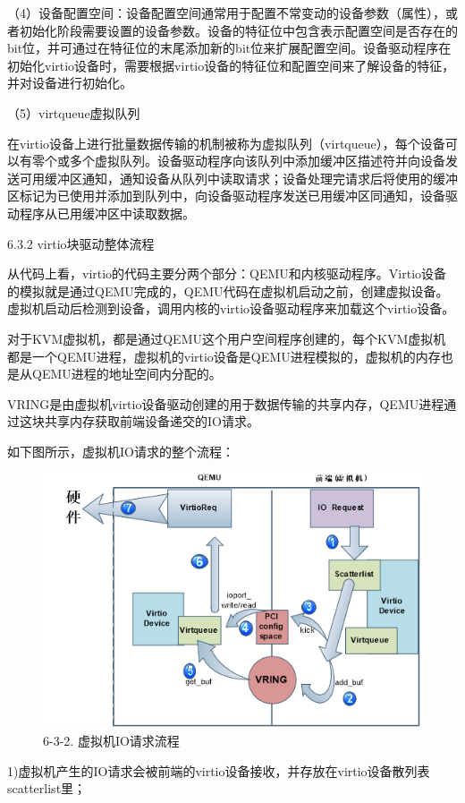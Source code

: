 （4）设备配置空间：设备配置空间通常用于配置不常变动的设备参数（属性），或者初始化阶段需要设置的设备参数。设备的特征位中包含表示配置空间是否存在的bit位，并可通过在特征位的末尾添加新的bit位来扩展配置空间。设备驱动程序在初始化virtio设备时，需要根据virtio设备的特征位和配置空间来了解设备的特征，并对设备进行初始化。

（5）virtqueue虚拟队列

在virtio设备上进行批量数据传输的机制被称为虚拟队列（virtqueue），每个设备可以有零个或多个虚拟队列。设备驱动程序向该队列中添加缓冲区描述符并向设备发送可用缓冲区通知，通知设备从队列中读取请求；设备处理完请求后将使用的缓冲区标记为已使用并添加到队列中，向设备驱动程序发送已用缓冲区同通知，设备驱动程序从已用缓冲区中读取数据。

6.3.2 virtio块驱动整体流程

从代码上看，virtio的代码主要分两个部分：QEMU和内核驱动程序。Virtio设备的模拟就是通过QEMU完成的，QEMU代码在虚拟机启动之前，创建虚拟设备。虚拟机启动后检测到设备，调用内核的virtio设备驱动程序来加载这个virtio设备。

对于KVM虚拟机，都是通过QEMU这个用户空间程序创建的，每个KVM虚拟机都是一个QEMU进程，虚拟机的virtio设备是QEMU进程模拟的，虚拟机的内存也是从QEMU进程的地址空间内分配的。

VRING是由虚拟机virtio设备驱动创建的用于数据传输的共享内存，QEMU进程通过这块共享内存获取前端设备递交的IO请求。

如下图所示，虚拟机IO请求的整个流程：

\begin{figure}[H]
    \centering
    \includegraphics{figures/06-03-2.png}
    \caption{6-3-2. 虚拟机IO请求流程}
\end{figure}
1)虚拟机产生的IO请求会被前端的virtio设备接收，并存放在virtio设备散列表scatterlist里；

